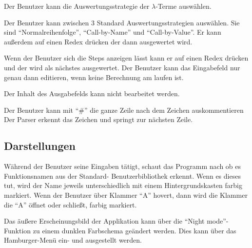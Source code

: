 \documentclass[parskip=full,11pt,twoside]{scrartcl}
\begin{document}
Der Benutzer kann die Auswertungsstrategie der $\lambda$-Terme auswählen.

Der Benutzer kann zwischen 3 Standard Auswertungsstrategien auswählen. Sie sind \enquote{Normalreihenfolge}, \enquote{Call-by-Name} und \enquote{Call-by-Value}.
Er kann außerdem auf einen Redex drücken der dann ausgewertet wird.

Wenn der Benutzer sich die Steps anzeigen lässt kann er auf  einen Redex drücken und der wird als nächstes ausgewertet. 
Der Benutzer kann das Eingabefeld nur genau dann editieren, wenn keine Berechnung am laufen ist.

Der Inhalt des Ausgabefelds kann nicht bearbeitet werden.

Der Benutzer kann mit \enquote{\#} die ganze Zeile nach dem Zeichen auskommentieren
Der Parser erkennt das Zeichen und springt zur nächsten Zeile.

\subsection{Darstellungen}
Während der Benutzer seine Eingaben tätigt, schaut das Programm nach ob es Funktionsnamen aus der Standard- Benutzerbibliothek erkennt. Wenn es dieses tut, wird der Name jeweils unterschiedlich mit einem Hintergrundskasten farbig markiert.
Wenn der Benutzer über Klammer \enquote{A} hovert, dann wird die Klammer die \enquote{A} öffnet oder schließt, farbig markiert.

Das äußere Erscheinungsbild der Applikation kann über die \enquote{Night mode}-Funktion zu einem dunklen Farbschema geändert werden. Dies kann über das Hamburger-Menü ein- und ausgestellt werden.
\end{document}
